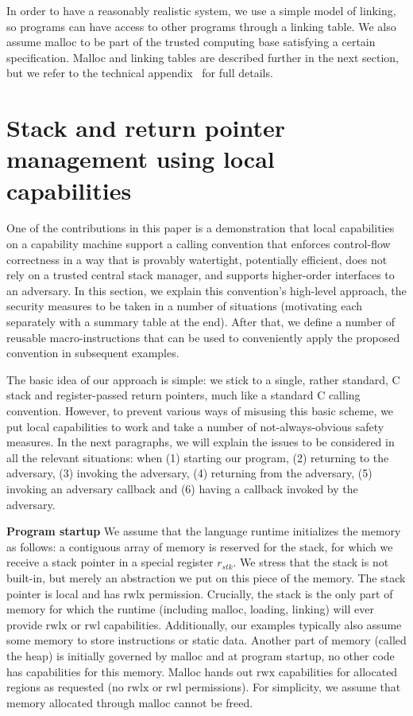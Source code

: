 \documentclass[compsoc,conference,letterpaper,fleqn]{IEEEtran}
\newcommand{\var}[1]{\mathit{#1}}
\newcommand{\stk}{\var{stk}}
\newcommand{\plainperm}[1]{\mathrm{#1}}
\newcommand{\rwx}{\plainperm{rwx}}
\newcommand{\readwritel}{\plainperm{rwl}}
\newcommand{\rwl}{\readwritel}
\newcommand{\rwlx}{\plainperm{rwlx}}
\begin{document}

In order to have a reasonably realistic system, we use a simple model of
linking, so programs can have access to other programs through a linking table.
We also assume malloc to be part of the trusted computing base satisfying a
certain specification. Malloc and linking tables are described further in the
next section, but we refer to the technical appendix~\cite{technical_appendix}
for full details.

\section{Stack and return pointer management using local capabilities}
\label{sec:stack-and-return-pointer}
One of the contributions in this paper is a demonstration that local
capabilities on a capability machine support a calling convention that enforces
control-flow correctness in a way that is provably watertight, potentially
efficient, does not rely on a trusted central stack manager, and supports
higher-order interfaces to an adversary. In this section, we explain this
convention's high-level approach, the security measures to be taken in a number
of situations (motivating each separately with a summary table at the end).
After that, we define a number of reusable macro-instructions that can be used
to conveniently apply the proposed convention in subsequent examples.

The basic idea of our approach is simple: we stick to a single, rather standard,
C stack and register-passed return pointers, much like a standard C calling
convention. However, to prevent various ways of misusing this basic scheme, we
put local capabilities to work and take a number of not-always-obvious safety
measures. In the next paragraphs, we will explain the issues to be considered in
all the relevant situations: when (1) starting our program, (2) returning to the
adversary, (3) invoking the adversary, (4) returning from the adversary, (5)
invoking an adversary callback and (6) having a callback invoked by the
adversary.

\textbf{Program startup} We assume that the language runtime initializes the
memory as follows: a contiguous array of memory is reserved for the stack, for
which we receive a stack pointer in a special register $r_\stk$. We stress that
the stack is not built-in, but merely an abstraction we put on this piece of the
memory. The stack pointer is local and has $\rwlx$ permission. Crucially, the
stack is the only part of memory for which the runtime (including malloc,
loading, linking) will ever provide $\rwlx$ or $\rwl$ capabilities.
Additionally, our examples typically also assume some memory to store
instructions or static data. Another part of memory (called the heap) is
initially governed by malloc and at program startup, no other code has
capabilities for this memory. Malloc hands out $\rwx$ capabilities for allocated
regions as requested (no $\rwlx$ or $\rwl$ permissions). For simplicity, we
assume that memory allocated through malloc cannot be freed.
\end{document}
